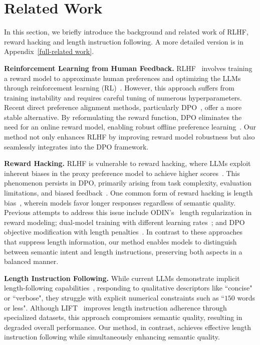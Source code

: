 \section{Related Work}
\label{related-work}

In this section, we briefly introduce the background and related work of RLHF, reward hacking and length instruction following. A more detailed version is in Appendix~\ref{full-related work}.

{\bf Reinforcement Learning from Human Feedback.} RLHF~\citep{ziegler2019fine} involves training a reward model to approximate human preferences and optimizing the LLMs through reinforcement learning (RL)~\citep{schulman2017proximal}. However, this approach suffers from training instability and requires careful tuning of numerous hyperparameters. Recent direct preference alignment methods, particularly DPO~\citep{rafailov2024direct}, offer a more stable alternative. By reformulating the reward function, DPO eliminates the need for an online reward model, enabling robust offline preference learning~\citep{hong2024orpo, chen2024noise, ethayarajh2024kto}. Our method not only enhances RLHF by improving reward model robustness but also seamlessly integrates into the DPO framework.

{\bf Reward Hacking.} RLHF is vulnerable to reward hacking, where LLMs exploit inherent biases in the proxy preference model to achieve higher scores~\citep{pan2022effects, casper2023open, lambert2023alignment}. This phenomenon persists in DPO, primarily arising from task complexity, evaluation limitations, and biased feedback~\citep{dubois2024alpacafarm}. One common form of reward hacking is length bias~\citep{singhal2023long, park2024disentangling}, wherein models favor longer responses regardless of semantic quality. Previous attempts to address this issue include ODIN's~\citep{chenodin} length regularization in reward modeling; dual-model training with different learning rates~\citep{shen2023loose}; and DPO objective modification with length penalties~\citep{park2024disentangling}. In contrast to these approaches that suppress length information, our method enables models to distinguish between semantic intent and length instructions, preserving both aspects in a balanced manner.

{\bf Length Instruction Following.} While current LLMs demonstrate implicit length-following capabilities~\citep{yuan2024following}, responding to qualitative descriptors like ``concise" or ``verbose", they struggle with explicit numerical constraints such as ``$150$ words or less". Although LIFT~\citep{yuan2024following} improves length instruction adherence through specialized datasets, this approach compromises semantic quality, resulting in degraded overall performance. Our method, in contrast, achieves effective length instruction following while simultaneously enhancing semantic quality.